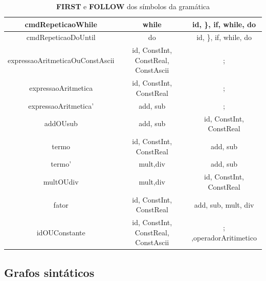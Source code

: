 \documentclass[11pt]{article}
\begin{document}
\begin{table}[H]
\begin{tabular}{c|c|c}
        \hline
        cmdRepeticaoWhile    & while                               & id, \}, if, while, do \\
        \hline
        cmdRepeticaoDoUntil  & do                                  & id, \}, if, while, do \\
        \hline
        expressaoAritmeticaOuConstAscii & id, ConstInt, ConstReal, ConstAscii & ; \\
        \hline
        expressaoAritmetica  & id, ConstInt, ConstReal & ; \\
        \hline
        expressaoAritmetica' & add, sub                 & ; \\
        \hline
        addOUsub             & add, sub                 & id, ConstInt, ConstReal \\
        \hline
        termo                &  id, ConstInt, ConstReal & add, sub \\
        \hline
        termo'               & mult,div                 & add, sub \\
        \hline
        multOUdiv            & mult,div                 & id, ConstInt, ConstReal \\
        \hline
        fator           &  id, ConstInt, ConstReal                 & add, sub, mult, div \\
        \hline
        idOUConstante        & id, ConstInt, ConstReal, ConstAscii &  ; ,operadorAritimetico \\
        \hline
    \end{tabular}
    \caption{\textbf{FIRST} e \textbf{FOLLOW} dos símbolos da gramática}
\end{table}


\subsection*{Grafos sintáticos}
\end{document}

